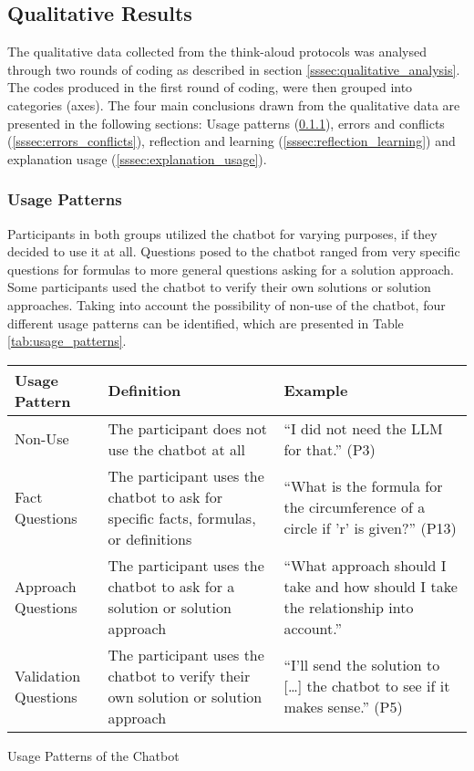 \endgroup

\subsection{Qualitative Results} \label{ssec:qual_results}

The qualitative data collected from the think-aloud protocols was analysed through two rounds of coding as described in section \ref{sssec:qualitative_analysis}. The codes produced in the first round of coding, were then grouped into categories (axes). The four main conclusions drawn from the qualitative data are presented in the following sections: Usage patterns (\ref{sssec:usage_patterns}), errors and conflicts (\ref{sssec:errors_conflicts}), reflection and learning (\ref{sssec:reflection_learning}) and explanation usage (\ref{sssec:explanation_usage}).

\subsubsection{Usage Patterns} \label{sssec:usage_patterns}

Participants in both groups utilized the chatbot for varying purposes, if they decided to use it at all. Questions posed to the chatbot ranged from very specific questions for formulas to more general questions asking for a solution approach. Some participants used the chatbot to verify their own solutions or solution approaches. Taking into account the possibility of non-use of the chatbot, four different usage patterns can be identified, which are presented in Table \ref{tab:usage_patterns}.

\begin{ctable}
    \begin{tabularx}{\textwidth}{l|X|X}
        \textbf{Usage Pattern} & \textbf{Definition} & \textbf{Example} \\
        \hline
        Non-Use & The participant does not use the chatbot at all & “I did not need the LLM for that.” (P3) \\
        Fact Questions & The participant uses the chatbot to ask for specific facts, formulas, or definitions & “What is the formula for the circumference of a circle if 'r' is given?” (P13) \\
        Approach Questions & The participant uses the chatbot to ask for a solution or solution approach & “What approach should I take and how should I take the relationship into account.” \\
        Validation Questions & The participant uses the chatbot to verify their own solution or solution approach & “I'll send the solution to [\dots] the chatbot to see if it makes sense.” (P5)
    \end{tabularx}
    \caption{Usage Patterns of the Chatbot}
    \label{tab:usage_patterns}
\end{ctable}

